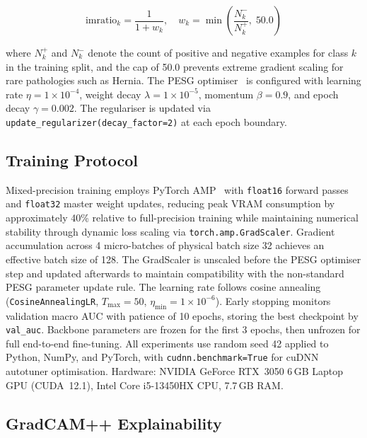 \documentclass[conference]{IEEEtran}
\begin{document}
\begin{equation}
\text{imratio}_k = \frac{1}{1 + w_k}, \quad
w_k = \min\!\left(\frac{N_k^-}{N_k^+},\; 50.0\right)
\label{eq:imratio}
\end{equation}

where $N_k^+$ and $N_k^-$ denote the count of positive and negative
examples for class $k$ in the training split, and the cap of 50.0
prevents extreme gradient scaling for rare pathologies such as Hernia.
The PESG optimiser~\cite{yuan2021} is configured with learning rate
$\eta = 1\times10^{-4}$, weight decay $\lambda = 1\times10^{-5}$,
momentum $\beta = 0.9$, and epoch decay $\gamma = 0.002$. The
regulariser is updated via \texttt{update\_regularizer(decay\_factor=2)}
at each epoch boundary.

\subsection{Training Protocol}

Mixed-precision training employs PyTorch AMP~\cite{micikevicius2018}
with \texttt{float16} forward passes and \texttt{float32} master weight
updates, reducing peak VRAM consumption by approximately 40\% relative
to full-precision training while maintaining numerical stability through
dynamic loss scaling via \texttt{torch.amp.GradScaler}. Gradient
accumulation across 4 micro-batches of physical batch size 32 achieves
an effective batch size of 128. The GradScaler is unscaled before the
PESG optimiser step and updated afterwards to maintain compatibility
with the non-standard PESG parameter update rule. The learning rate
follows cosine annealing (\texttt{CosineAnnealingLR}, $T_{\max}=50$,
$\eta_{\min}=1\times10^{-6}$). Early stopping monitors validation macro
AUC with patience of 10 epochs, storing the best checkpoint by
\texttt{val\_auc}. Backbone parameters are frozen for the first 3
epochs, then unfrozen for full end-to-end fine-tuning. All experiments
use random seed 42 applied to Python, NumPy, and PyTorch, with
\texttt{cudnn.benchmark=True} for cuDNN autotuner optimisation.
Hardware: NVIDIA GeForce RTX~3050 6\,GB Laptop GPU (CUDA~12.1),
Intel Core i5-13450HX CPU, 7.7\,GB RAM.

\subsection{GradCAM++ Explainability}
\end{document}
